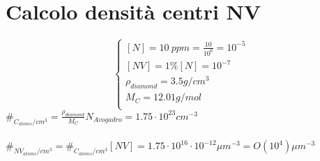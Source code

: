 \documentclass{report}
\begin{document}
\section{Calcolo densità centri NV}
\begin{equation}
\begin{cases}
 [N] = 10 \ ppm = \frac{10}{10^6} = 10^{-5}\\
 [NV] = 1 \% [N] = 10^{-7}\\
 \rho_{diamond} = 3.5 g / cm^3\\
 M_C = 12.01 g / mol\\
\end{cases}
\end{equation}
$  \#_{C_{atoms}/cm^3} = \frac{\rho_{diamond}}{M_C} N_{Avogadro} = 1.75\cdot 10^{23} cm^{-3}  $ \\ \\
$  \#_{NV_{atoms}/cm^3} = \#_{C_{atoms}/cm^3}[NV] = 1.75\cdot 10^{16} \cdot 10^{-12} \mu m^{-3} = O(10^4)\mu m^{-3}  $
\end{document}
